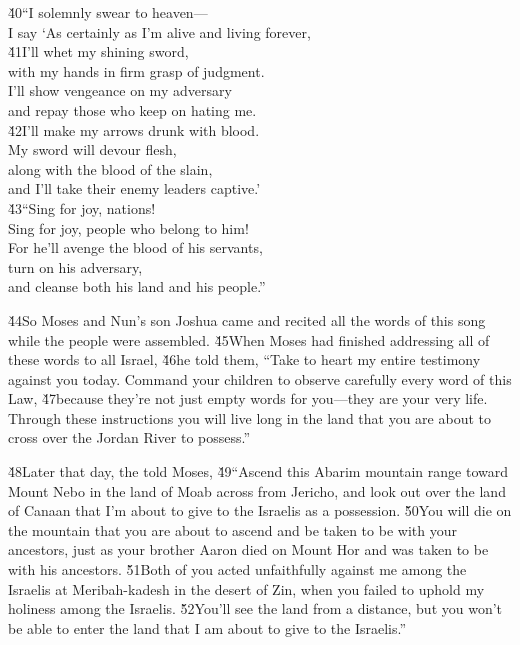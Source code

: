 \begin{poetry}
\poeml \v{40}``I solemnly swear to heaven--- \\
\poemll    I say `As certainly as I'm alive and living forever, \\
\poeml \v{41}I'll whet my shining sword, \\
\poemll    with my hands in firm grasp of judgment. \\
\poeml I'll show vengeance on my adversary \\
\poemll    and repay those who keep on hating me. \\
\poeml \v{42}I'll make my arrows drunk with blood. \\
\poemll    My sword will devour flesh, \\
\poemlll       along with the blood of the slain, \\
\poemll    and I'll take their enemy leaders captive.' \\
\poeml \v{43}``Sing for joy, nations! \\
\poemll    Sing for joy, people who belong to him! \\
\poeml For he'll avenge the blood of his servants, \\
\poemll    turn on his adversary, \\
\poemlll       and cleanse both his land and his people.''
\end{poetry}

\v{44}So Moses and Nun's son Joshua came and recited all the words of this song while the people were assembled. \v{45}When Moses had finished addressing all of these words to all Israel, \v{46}he told them, ``Take to heart my entire testimony against you today. Command your children to observe carefully every word of this Law, \v{47}because they're not just empty words for you---they are your very life. Through these instructions you will live long in the land that you are about to cross over the Jordan River to possess.''

\v{48}Later that day, the  told Moses, \v{49}``Ascend this Abarim mountain range toward Mount Nebo in the land of Moab across from Jericho, and look out over the land of Canaan that I'm about to give to the Israelis as a possession. \v{50}You will die on the mountain that you are about to ascend and be taken to be with your ancestors, just as your brother Aaron died on Mount Hor and was taken to be with his ancestors. \v{51}Both of you acted unfaithfully against me among the Israelis at Meribah-kadesh in the desert of Zin, when you failed to uphold my holiness among the Israelis. \v{52}You'll see the land from a distance, but you won't be able to enter the land that I am about to give to the Israelis.''

